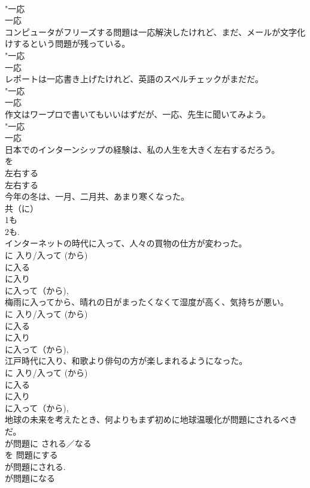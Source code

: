 \documentclass[8pt]{extreport}
\begin{document}
\begin{CJK}{UTF8}{min}
{\\	"一応 
\\	一応 
\\	コンピュータがフリーズする問題は一応解決したけれど、まだ、メールが文字化けするという問題が残っている。	
\\	"一応 
\\	一応 
\\	レポートは一応書き上げたけれど、英語のスペルチェックがまだだ。	
\\	"一応 
\\	一応 
\\	作文はワープロで書いてもいいはずだが、一応、先生に聞いてみよう。	
\\	"一応 
\\	一応 
\\	日本でのインターンシップの経験は、私の人生を大きく左右するだろう。	
\\	を 
\\	左右する 
\\	左右する 
\\	今年の冬は、一月、二月共、あまり寒くなった。	
\\	共（に） 
\\	1も
\\	2も.
\\	インターネットの時代に入って、人々の買物の仕方が変わった。	
\\	に {入り/入って (から)} 
\\	に入る 
\\	に入り 
\\	に入って（から), 
\\	梅雨に入ってから、晴れの日がまったくなくて湿度が高く、気持ちが悪い。	
\\	に {入り/入って (から)} 
\\	に入る 
\\	に入り 
\\	に入って（から), 
\\	江戸時代に入り、和歌より俳句の方が楽しまれるようになった。	
\\	に {入り/入って (から)} 
\\	に入る 
\\	に入り 
\\	に入って（から), 
\\	地球の未来を考えたとき、何よりもまず初めに地球温暖化が問題にされるべきだ。	
\\	が問題に {される／なる} 
\\	を 問題にする 
\\	が問題にされる. 
\\	が問題になる 
}
\end{CJK}
\end{document}
